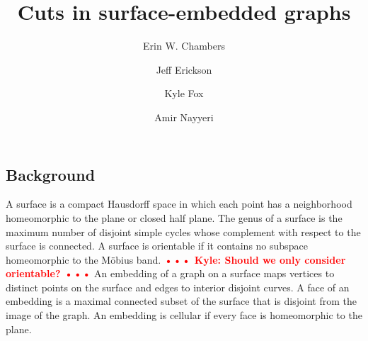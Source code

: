 \documentclass[natbib]{svcyclop}
\def\NOTE#1{\textcolor{Red}{\textbf{\textsf{••• #1 •••}}}}
\begin{document}
\title{Cuts in surface-embedded graphs}


\author{
	Erin W. Chambers
\and
	Jeff Erickson
\and
	Kyle Fox
\and
	Amir Nayyeri}







\maketitle


\ProbDef

\subsection{Background}


A surface is a compact Hausdorff space in which each point has a neighborhood homeomorphic to the plane or closed half plane.
The genus of a surface is the maximum number of disjoint simple cycles whose complement with respect to the surface is connected.
A surface is orientable if it contains no subspace homeomorphic to the M\"{o}bius band.
\NOTE{Kyle: Should we only consider orientable?}
An embedding of a graph on a surface maps vertices to distinct points on the surface and edges to interior disjoint curves.  
A face of an embedding is a maximal connected subset of the surface that is disjoint from the image of the graph.
An embedding is cellular if every face is homeomorphic to the plane.
\end{document}

